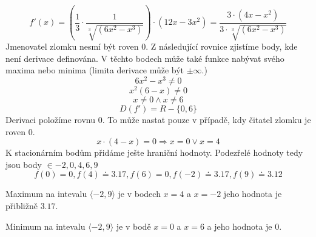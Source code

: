 \begin{displaymath}
f'(x)=\left(\frac{1}{3}\cdot\frac{1}{\sqrt[3]{(6x^2-x^3)}}\right)\cdot(12x-3x^2)=\frac{3\cdot(4x-x^2)}{3\cdot\sqrt[3]{(6x^2-x^3)}}
\end{displaymath}
Jmenovatel zlomku nesmí být roven 0. Z následující rovnice zjistíme body, kde není derivace definována. V těchto bodech může také funkce nabývat svého maxima nebo minima (limita derivace může být $\pm \infty$.)
\begin{displaymath}
6x^2-x^3\neq0
\end{displaymath}
\begin{displaymath}
x^2(6-x)\neq0
\end{displaymath}
\begin{displaymath}
x\neq0 \wedge  x\neq6
\end{displaymath}
\begin{displaymath}
D(f')=R-\{0,6\}
\end{displaymath}
Derivaci položíme rovnu 0. To může nastat pouze v případě, kdy čitatel zlomku je roven 0.
\begin{displaymath}
x\cdot(4-x) = 0 \Rightarrow x = 0 \vee x = 4
\end{displaymath}
K stacionárním bodům přidáme ješte hraniční hodnoty. 
Podezřelé hodnoty tedy jsou body $ \in{-2,0,4,6,9} $
\begin{displaymath}
f(0) = 0, f(4) \doteq 3.17, f(6) = 0, f(-2) \doteq 3.17, f(9) \doteq 3.12
\end{displaymath}

Maximum na intevalu $ \langle-2,9\rangle$ je v bodech $x=4$ a $x=-2$ jeho hodnota je přibližně $3.17$.

Minimum na intevalu $ \langle-2,9\rangle$ je v bodě $x=0$ a $x=6$ a jeho hodnota je $0$.

